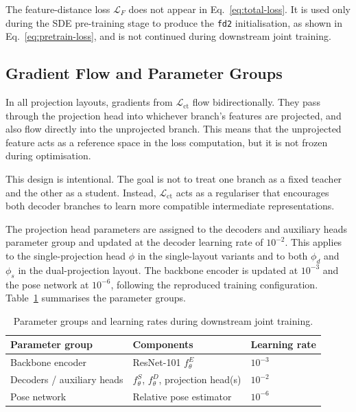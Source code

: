 The feature-distance loss $\mathcal{L}_F$ does not appear in
Eq.~\ref{eq:total-loss}. It is used only during the SDE pre-training stage
to produce the \texttt{fd2} initialisation, as shown in
Eq.~\ref{eq:pretrain-loss}, and is not continued during downstream joint
training.

\subsection{Gradient Flow and Parameter Groups}
\label{sec:grad-flow}

In all projection layouts, gradients from $\mathcal{L}_\text{ct}$ flow
bidirectionally. They pass through the projection head into whichever
branch's features are projected, and also flow directly into the
unprojected branch. This means that the unprojected feature acts as a
reference space in the loss computation, but it is not frozen during
optimisation.

This design is intentional. The goal is not to treat one branch as a fixed
teacher and the other as a student. Instead, $\mathcal{L}_\text{ct}$ acts
as a regulariser that encourages both decoder branches to learn more
compatible intermediate representations.

The projection head parameters are assigned to the decoders and
auxiliary heads parameter group and updated at the decoder learning rate
of $10^{-2}$.
This applies to the single-projection head $\phi$ in the single-layout
variants and to both $\phi_d$ and $\phi_s$ in the dual-projection layout.
The backbone encoder is updated at $10^{-3}$ and the pose network at
$10^{-6}$, following the reproduced training configuration.
Table~\ref{tab:param-groups} summarises the parameter groups.

\begin{table}[H]
\centering
\caption{Parameter groups and learning rates during downstream joint
training.}
\label{tab:param-groups}
\small
\begin{tabular}{lll}
\toprule
\textbf{Parameter group} & \textbf{Components} & \textbf{Learning rate} \\
\midrule
Backbone encoder          & ResNet-101 $f_\theta^E$                              & $10^{-3}$ \\
Decoders / auxiliary heads    & $f_\theta^S$, $f_\theta^D$, projection head(s) & $10^{-2}$ \\
Pose network              & Relative pose estimator                              & $10^{-6}$ \\
\bottomrule
\end{tabular}
\end{table}

